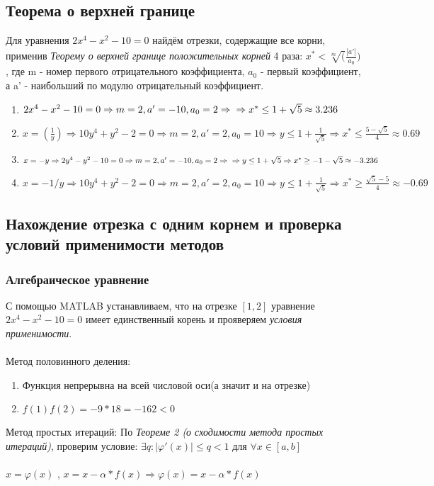 \documentclass{article}
\begin{document}
	\subsection{Теорема о верхней границе}
	Для уравнения $2x^4-x^2-10=0$ найдём отрезки, содержащие все корни, применив \emph{Теорему о верхней границе положительных корней} 4 раза: $x^*<\sqrt[m](\frac{|a'|}{a_0})$, где m - номер первого отрицательного коэффициента, $a_0$ - первый коэффициент, а a' - наибольший по модулю отрицательный коэффициент.
	\begin{enumerate}
		\item $2x^4-x^2-10=0 \Rightarrow m=2, a'=-10, a_0=2 \Rightarrow
		\\ \Rightarrow x^* \leq 1 + \sqrt{5}\approx 3.236$
		\item $x=(\frac{1}{y}) \Rightarrow 10y^4+y^2-2=0 \Rightarrow m=2, a'=2, a_0=10 \Rightarrow y \leq 1 + \frac{1}{\sqrt5} \Rightarrow x^* \leq \frac{5-\sqrt{5}}{4}\approx 0.69 $
		\item $x=-y \Rightarrow 2y^4-y^2-10=0 \Rightarrow m=2, a'=-10, a_0=2 \Rightarrow
		\\ \Rightarrow y \leq 1 + \sqrt{5} \Rightarrow x^* \geq -1 - \sqrt{5} \approx -3.236$
		\item $x=-1/y \Rightarrow 10y^4+y^2-2=0 \Rightarrow m=2, a'=2, a_0=10 \Rightarrow y \leq 1 + \frac{1}{\sqrt5} \Rightarrow x^* \geq \frac{\sqrt{5}-5}{4} \approx -0.69 $
	\end{enumerate}
	\subsection{Нахождение отрезка с одним корнем и проверка условий применимости методов}
	\subsubsection{Алгебраическое уравнение}
	С помощью MATLAB устанавливаем, что на отрезке $[1, 2]$ уравнение $2x^4-x^2-10=0$ имеет единственный корень и прояверяем \emph{условия применимости}.
	~\\
	~\\
	Метод половинного деления:
	\begin{enumerate}
		\item Функция непрерывна на всей числовой оси(а значит и на отрезке)
		\item $f(1)f(2)=-9*18 = -162 < 0$
	\end{enumerate}
	Метод простых итераций:
	По \emph{ Теореме 2 (о сходимости метода простых итераций)}, проверим  условие: 
	$\exists q: |\varphi'(x)|\leq q<1$ для $\forall x \in [a, b]$
	~\\
	~\\
	$x = \varphi(x)$ , $x = x - \alpha*f(x) \Rightarrow \varphi(x) = x - \alpha * f(x)$
	~\\
	~\\
	
\end{document}
